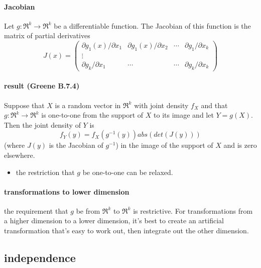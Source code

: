 \paragraph{Jacobian}
\label{sec-2-2-1}

      Let $g: \Re^k \to \Re^k$ be a differentiable function.  The
      Jacobian of this function is the matrix of partial derivatives
      \[ J(x) = \begin{pmatrix} \partial g_1(x) / \partial x_1 & \partial
      g_1(x) / \partial x_2 & \cdots & \partial g_1 / \partial x_k \\
      \vdots \\ \partial g_k / \partial x_1 & \cdots & \cdots & \partial g_k /
      \partial x_k \end{pmatrix} \]
\paragraph{result (Greene B.7.4)}
\label{sec-2-2-2}

      Suppose that $X$ is a random vector in $\Re^k$ with joint
      density $f_X$ and that $g: \Re^k \to \Re^k$ is one-to-one from
      the support of $X$ to its image and let $Y = g(X)$.  Then the
      joint density of $Y$ is \[ f_Y(y) = f_X(g^{-1}(y)) abs(det( J(y)
      ))\] (where $J(y)$ is the Jacobian of $g^{-1}$) in the image of
      the support of $X$ and is zero elsewhere.
\begin{itemize}
\item the restriction that $g$ be one-to-one can be relaxed.
\end{itemize}
\paragraph{transformations to lower dimension}
\label{sec-2-2-3}

      the requirement that $g$ be from $\Re^k$ to $\Re^k$ is restrictive.
      For transformations from a higher dimension to a lower dimension,
      it's best to create an artificial transformation that's easy to
      work out, then integrate out the other dimension.
\subsection{independence}
\label{sec-2-3}

